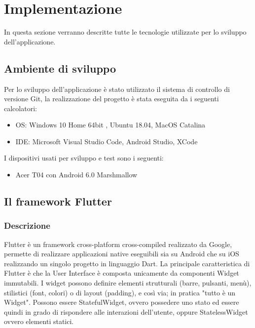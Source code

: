 \chapter{Implementazione\label{sec:implementazione}}
In questa sezione verranno descritte tutte le tecnologie utilizzate per lo sviluppo dell'applicazione.
\section{Ambiente di sviluppo\label{sec:ambiente}}
Per lo sviluppo dell'applicazione è stato utilizzato il sistema di controllo di versione Git,  la realizzazione del progetto è stata eseguita da i seguenti calcolatori:
\begin{itemize}
	\item OS: Windows 10 Home 64bit , Ubuntu 18.04, MacOS Catalina
	\item IDE: Microsoft Visual Studio Code, Android Studio, XCode
\end{itemize}

I dispositivi usati per sviluppo e test sono i seguenti:
\begin{itemize}
    \item Acer T04 con Android 6.0 Marshmallow
\end{itemize}
\section{Il framework Flutter\label{sec:flutter}}
\subsection{Descrizione\label{sec:flutter-descrizione}}
Flutter è un framework cross-platform cross-compiled realizzato da Google, permette di realizzare applicazioni native eseguibili sia su Android che su iOS realizzando un singolo progetto in linguaggio Dart. La principale caratteristica di Flutter è che la User Interface è composta unicamente da componenti Widget immutabili. I widget possono definire elementi strutturali (barre, pulsanti, menù), stilistici (font, colori) o di layout (padding), e così via; in pratica "tutto è un Widget". Possono essere StatefulWidget, ovvero possedere uno stato ed essere quindi in grado di rispondere alle interazioni dell'utente, oppure StatelessWidget ovvero elementi statici.

